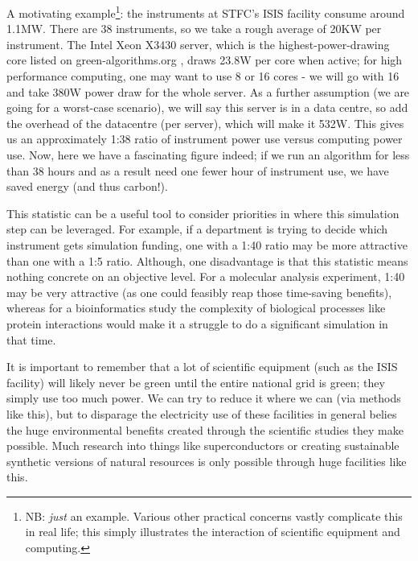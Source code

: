 \documentclass{article}
\begin{document}
A motivating example\footnote{NB: \emph{just} an example. Various other practical concerns vastly complicate this in real life; this simply illustrates the interaction of scientific equipment and computing.}: the instruments at STFC's ISIS facility consume around 1.1MW.\citep{findlay2021practical} There are 38 instruments, so we take a rough average of 20KW per instrument. The Intel Xeon X3430 server, which is the highest-power-drawing core listed on green-algorithms.org \citep{lannelongue2021green}, draws 23.8W per core when active; for high performance computing, one may want to use 8 or 16 cores - we will go with 16 and take 380W power draw for the whole server. As a further assumption (we are going for a worst-case scenario), we will say this server is in a data centre, so add the overhead of the datacentre (per server), which will make it 532W. This gives us an approximately 1:38 ratio of instrument power use versus computing power use. Now, here we have a fascinating figure indeed; if we run an algorithm for less than 38 hours and as a result need one fewer hour of instrument use, we have saved energy (and thus carbon!). \newline

This statistic can be a useful tool to consider priorities in where this simulation step can be leveraged. For example, if a department is trying to decide which instrument gets simulation funding, one with a 1:40 ratio may be more attractive than one with a 1:5 ratio. Although, one disadvantage is that this statistic means nothing concrete on an objective level. For a molecular analysis experiment, 1:40 may be very attractive (as one could feasibly reap those time-saving benefits), whereas for a bioinformatics study the complexity of biological processes like protein interactions would make it a struggle to do a significant simulation in that time. \newline

It is important to remember that a lot of scientific equipment (such as the ISIS facility) will likely never be green until the entire national grid is green; they simply use too much power. We can try to reduce it where we can (via methods like this), but to disparage the electricity use of these facilities in general belies the huge environmental benefits created through the scientific studies they make possible. Much research into things like superconductors \citep{shang2018time} or creating sustainable synthetic versions of natural resources \citep{griffiths2010pgse} is only possible through huge facilities like this. 
\end{document}
